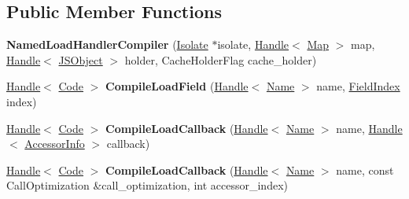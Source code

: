 \subsection*{Public Member Functions}
\begin{DoxyCompactItemize}
\item 
{\bfseries Named\+Load\+Handler\+Compiler} (\hyperlink{classv8_1_1internal_1_1_isolate}{Isolate} $\ast$isolate, \hyperlink{classv8_1_1internal_1_1_handle}{Handle}$<$ \hyperlink{classv8_1_1internal_1_1_map}{Map} $>$ map, \hyperlink{classv8_1_1internal_1_1_handle}{Handle}$<$ \hyperlink{classv8_1_1internal_1_1_j_s_object}{J\+S\+Object} $>$ holder, Cache\+Holder\+Flag cache\+\_\+holder)\hypertarget{classv8_1_1internal_1_1_named_load_handler_compiler_ab0475d84e8be09e057cec3db380c199d}{}\label{classv8_1_1internal_1_1_named_load_handler_compiler_ab0475d84e8be09e057cec3db380c199d}

\item 
\hyperlink{classv8_1_1internal_1_1_handle}{Handle}$<$ \hyperlink{classv8_1_1internal_1_1_code}{Code} $>$ {\bfseries Compile\+Load\+Field} (\hyperlink{classv8_1_1internal_1_1_handle}{Handle}$<$ \hyperlink{classv8_1_1internal_1_1_name}{Name} $>$ name, \hyperlink{classv8_1_1internal_1_1_field_index}{Field\+Index} index)\hypertarget{classv8_1_1internal_1_1_named_load_handler_compiler_a39d6289bb9e55f86cf8d642a022bae13}{}\label{classv8_1_1internal_1_1_named_load_handler_compiler_a39d6289bb9e55f86cf8d642a022bae13}

\item 
\hyperlink{classv8_1_1internal_1_1_handle}{Handle}$<$ \hyperlink{classv8_1_1internal_1_1_code}{Code} $>$ {\bfseries Compile\+Load\+Callback} (\hyperlink{classv8_1_1internal_1_1_handle}{Handle}$<$ \hyperlink{classv8_1_1internal_1_1_name}{Name} $>$ name, \hyperlink{classv8_1_1internal_1_1_handle}{Handle}$<$ \hyperlink{classv8_1_1internal_1_1_accessor_info}{Accessor\+Info} $>$ callback)\hypertarget{classv8_1_1internal_1_1_named_load_handler_compiler_ac9e36e0b1f5e736078e86e6f4af519da}{}\label{classv8_1_1internal_1_1_named_load_handler_compiler_ac9e36e0b1f5e736078e86e6f4af519da}

\item 
\hyperlink{classv8_1_1internal_1_1_handle}{Handle}$<$ \hyperlink{classv8_1_1internal_1_1_code}{Code} $>$ {\bfseries Compile\+Load\+Callback} (\hyperlink{classv8_1_1internal_1_1_handle}{Handle}$<$ \hyperlink{classv8_1_1internal_1_1_name}{Name} $>$ name, const Call\+Optimization \&call\+\_\+optimization, int accessor\+\_\+index)\hypertarget{classv8_1_1internal_1_1_named_load_handler_compiler_aaa76a0a2ab6898e6dcb0fb1a075dcc20}{}\label{classv8_1_1internal_1_1_named_load_handler_compiler_aaa76a0a2ab6898e6dcb0fb1a075dcc20}


\end{DoxyCompactItemize}
